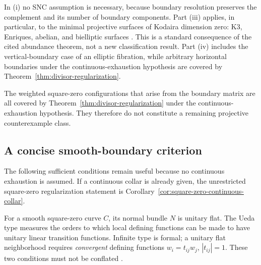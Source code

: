 \documentclass[11pt]{amsart}
\theoremstyle{definition}
\theoremstyle{remark}
\numberwithin{equation}{section}
\begin{document}
In \textup{(i)} no SNC assumption is necessary, because boundary
resolution preserves the complement and its number of boundary
components. Part \textup{(iii)} applies, in particular, to the minimal
projective surfaces of Kodaira dimension zero: K3, Enriques, abelian,
and bielliptic surfaces \cite[Chapter~VI]{BHPV2004}. This is a standard
consequence of the cited abundance theorem, not a new classification
result. Part \textup{(iv)} includes the vertical-boundary case of an
elliptic fibration, while arbitrary horizontal boundaries under the continuous-exhaustion
hypothesis are covered by Theorem~\ref{thm:divisor-regularization}.

The weighted square-zero configurations that arise from the
boundary matrix are all covered by Theorem~\ref{thm:divisor-regularization}
under the continuous-exhaustion hypothesis. They therefore do not
constitute a remaining projective counterexample class.

\subsection{A concise smooth-boundary criterion}
\label{subsec:smooth-boundary}

The following sufficient conditions remain useful because no continuous
exhaustion is assumed. If a continuous collar is already given, the
unrestricted square-zero regularization statement is
Corollary~\ref{cor:square-zero-continuous-collar}.

For a smooth square-zero curve $C$, its normal bundle $N$ is unitary
flat. The Ueda type measures the orders to which local defining
functions can be made to have unitary linear transition functions.
Infinite type is formal; a unitary flat neighborhood requires
\emph{convergent} defining functions $w_i=t_{ij}w_j$, $|t_{ij}|=1$.
These two conditions must not be conflated \cite{Ueda1983,CLPT2018}.
\end{document}
